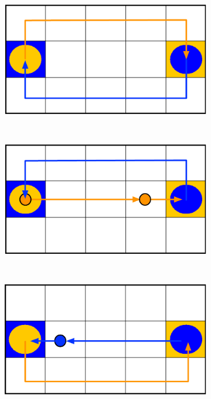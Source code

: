 
\begin{figure}
    \centering
    \begin{subfigure}[b]{0.275\textwidth}
        \includegraphics[width=\textwidth]{figures/batch1}
        \caption{}
        \label{fig:batch1}
    \end{subfigure}
\qquad
    ~ %
    \begin{subfigure}[b]{0.275\textwidth}
        \includegraphics[width=\textwidth]{figures/batch2}
        \caption{}
        \label{fig:batch2}
    \end{subfigure}
\qquad
    ~ %
    \begin{subfigure}[b]{0.275\textwidth}
        \includegraphics[width=\textwidth]{figures/batch3}

\end{subfigure}
\end{figure}
